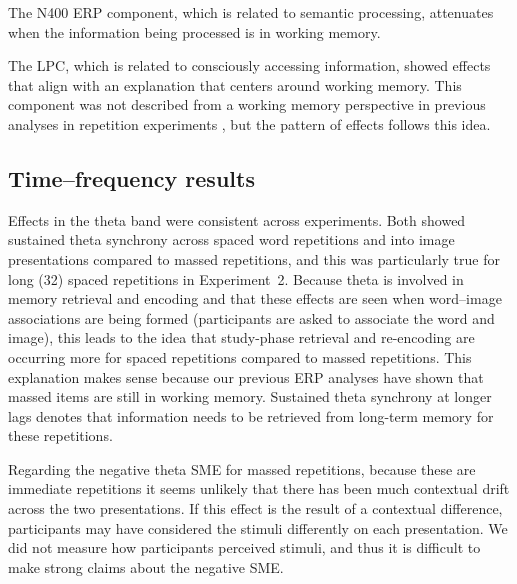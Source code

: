 
The N400 ERP component, which is related to semantic processing, attenuates when the information being processed is in working memory.


The LPC, which is related to consciously accessing information, showed effects that align with an explanation that centers around working memory.  This component was not described from a working memory perspective in previous analyses in repetition experiments \cite[rather, they discussed it as ``template matching'']{OlicEtal2000,VanSEtal2007}, but the pattern of effects follows this idea.


\subsection{Time--frequency results}

Effects in the theta band were consistent across experiments.  Both showed sustained theta synchrony across spaced word repetitions and into image presentations compared to massed repetitions, and this was particularly true for long (32) spaced repetitions in Experiment~2.  Because theta is involved in memory retrieval and encoding and that these effects are seen when word--image associations are being formed (participants are asked to associate the word and image), this leads to the idea that study-phase retrieval and re-encoding are occurring more for spaced repetitions compared to massed repetitions.  This explanation makes sense because our previous ERP analyses have shown that massed items are still in working memory.  Sustained theta synchrony at longer lags denotes that information needs to be retrieved from long-term memory for these repetitions.

Regarding the negative theta SME for massed repetitions, because these are immediate repetitions it seems unlikely that there has been much contextual drift across the two presentations.  If this effect is the result of a contextual difference, participants may have considered the stimuli differently on each presentation.  We did not measure how participants perceived stimuli, and thus it is difficult to make strong claims about the negative SME.

